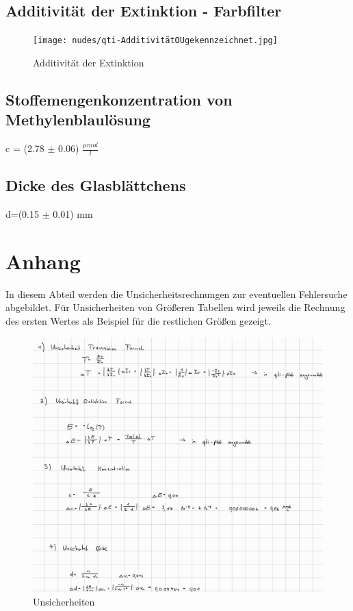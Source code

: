 \documentclass[12pt,a4paper,twoside]{article}
\begin{document}
\subsection{Additivität der Extinktion - Farbfilter}

\begin{figure}[H]
    \centering
    \texttt{[image: nudes/qti-AdditivitätOUgekennzeichnet.jpg]}
    \caption{Additivität der Extinktion}
    \label{fig:AdditivitätExtinktionAW}
\end{figure}


\subsection{Stoffemengenkonzentration von Methylenblaulösung}

c = (2.78 $\pm$ 0.06) $\frac{\mu mol}{l}$


\subsection{Dicke des Glasblättchens}

d=(0.15 $\pm$ 0.01) mm

\section{Anhang}

In diesem Abteil werden die Unsicherheitsrechnungen zur eventuellen Fehlersuche abgebildet. Für Unsicherheiten von Größeren Tabellen wird jeweils die Rechnung des ersten Wertes als Beispiel für die restlichen Größen gezeigt.

\begin{figure}[H]
    \centering
    \includegraphics[width=0.9\linewidth]{nudes/Unsicherheiten1.jpg}
    \caption{Unsicherheiten}
    \label{fig:Unsicherheiten1}
\end{figure}

\printbibliography[heading=bibintoc]
\end{document}
